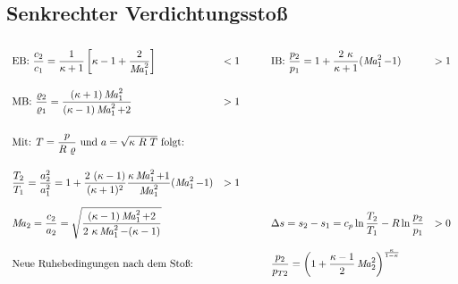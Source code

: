 \subsection{Senkrechter Verdichtungsstoß}
	\setlength{\abovedisplayskip}{-15pt}
		\[ \arraycolsep=0.5em \def\arraystretch{2.5}
		\begin{array}{llp{1em}ll}
			\text{EB: } \dfrac{c_2}{c_1} = \dfrac{1}{\kappa+1}  \left[ \kappa - 1 + \dfrac{2}{\Mach_1^2}\right]                                    & < 1 &  & \text{IB: } \dfrac{p_2}{p_1} = 1+ \dfrac{2\ \kappa}{\kappa+1} (\Mach_1^2 - 1)                   & > 1 \\
			\text{MB: } \dfrac{\varrho_2}{\varrho_1} = \dfrac{(\kappa+1)\Mach_1^2}  {(\kappa-1)\Mach_1^2 + 2}                                      & > 1 &  &                                                                                                 &     \\
			\text{Mit: }  T = \dfrac{p}{R\ \varrho} \text{ und } a = \sqrt{\kappa\ R\ T} \text{ folgt: }                                           &     &  &                                                                                                 &     \\
			\dfrac{T_2}{T_1} = \dfrac{a_2^2}{a_1^2} = 1 +\dfrac{2\ (\kappa-1)}{(\kappa+1)^2}  \dfrac{\kappa \Mach_1^2+1}{\Mach_1^2}  (\Mach_1^2-1) & > 1 &  &                                                                                                 &     \\
			\Mach_2 = \dfrac{c_2}{a_2} = \sqrt{\dfrac{(\kappa-1) \Mach_1^2 + 2}{2\ \kappa\Mach_1^2 - (\kappa-1)}}                                  &     &  & \Delta s = s_2 - s_1 = c_p \ln\dfrac{T_2}{T_1} - R \ln\dfrac{p_2}{p_1}                          & >0  \\
			\text{Neue Ruhebedingungen nach dem Stoß:}                                                                                             &     &  & \dfrac{p_2}{p_{T2}} = \left( 1+ \dfrac{\kappa -1}{2}\Mach_2^2\right) ^{\frac{\kappa}{1-\kappa}} &
		\end{array} \]

